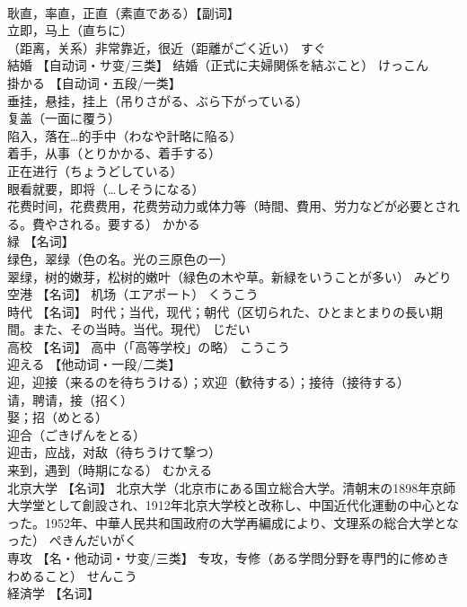 \documentclass[8pt]{extreport}
\begin{document}
\begin{CJK}{UTF8}{min}
\\	耿直，率直，正直（素直である）【副词】 
\\	立即，马上（直ちに） 
\\	（距离，关系）非常靠近，很近（距離がごく近い）	すぐ	
\\	結婚	【自动词・サ变/三类】 结婚（正式に夫婦関係を結ぶこと）	けっこん	
\\	掛かる	【自动词・五段/一类】 
\\	垂挂，悬挂，挂上（吊りさがる、ぶら下がっている） 
\\	复盖（一面に覆う） 
\\	陷入，落在…的手中（わなや計略に陥る） 
\\	着手，从事（とりかかる、着手する） 
\\	正在进行（ちょうどしている） 
\\	眼看就要，即将（…しそうになる） 
\\	花费时间，花费费用，花费劳动力或体力等（時間、費用、労力などが必要とされる。費やされる。要する）	かかる	
\\	緑	【名词】 
\\	绿色，翠绿（色の名。光の三原色の一） 
\\	翠绿，树的嫩芽，松树的嫩叶（緑色の木や草。新緑をいうことが多い）	みどり	
\\	空港	【名词】 机场（エアポート）	くうこう	
\\	時代	【名词】 时代；当代，现代；朝代（区切られた、ひとまとまりの長い期間。また、その当時。当代。現代）	じだい	
\\	高校	【名词】 高中（「高等学校」の略）	こうこう	
\\	迎える	【他动词・一段/二类】 
\\	迎，迎接（来るのを待ちうける）；欢迎（歓待する）；接待（接待する） 
\\	请，聘请，接（招く） 
\\	娶；招（めとる） 
\\	迎合（ごきげんをとる） 
\\	迎击，应战，对敌（待ちうけて撃つ） 
\\	来到，遇到（時期になる）	むかえる	
\\	北京大学	【名词】 北京大学（北京市にある国立総合大学。清朝末の1898年京師大学堂として創設され、1912年北京大学校と改称し、中国近代化運動の中心となった。1952年、中華人民共和国政府の大学再編成により、文理系の総合大学となった）	ぺきんだいがく	
\\	専攻	【名・他动词・サ变/三类】 专攻，专修（ある学問分野を専門的に修めきわめること）	せんこう	
\\	経済学	【名词】 

\end{CJK}
\end{document}
